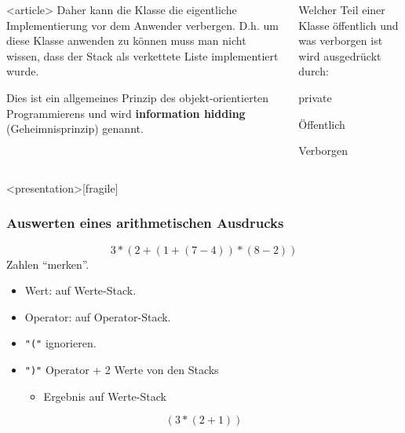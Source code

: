 \begin{multicols}{2}
\begin{frame}[fragile]
\begin{columns}[c]\begin{column}{0.45 \textwidth}
\begin{fact}
\begin{onlyenv}<article>
Daher kann die Klasse die eigentliche Implementierung vor dem Anwender verbergen.
D.h. um diese Klasse anwenden zu können muss man nicht wissen, dass der Stack als verkettete Liste implementiert wurde.
\end{onlyenv}
Dies ist ein allgemeines Prinzip des objekt-orientierten Programmierens und wird \textbf{information hidding} (Geheimnisprinzip) genannt.
\end{fact}
\end{column}\begin{column}{0.45 \textwidth}
\begin{definition}
Welcher Teil einer Klasse öffentlich und was verborgen ist wird ausgedrückt durch:
\begin{labeling}{private~}
\item [\textsf{public}] Öffentlich
\item [\textsf{private}] Verborgen
\end{labeling}
\end{definition}
\end{column}\end{columns}



\end{frame}


\end{multicols}

\begin{frame}<presentation>[fragile]
\frametitle{Auswerten eines arithmetischen Ausdrucks}
%
\[3 * (2 + ( 1 + ( 7- 4) ) * (8 - 2) )\]
%
Zahlen "`merken"'.
\vfill\pause

\begin{itemize}%
\item Wert: auf Werte-Stack.
\item Operator: auf Operator-Stack.
\item \lstinline{"("} ignorieren.
\item \lstinline{")"} Operator + 2 Werte von den Stacks 
	\begin{itemize}%
	\item Ergebnis auf Werte-Stack
	\end{itemize}
\end{itemize}

\vfill
{}
\[(3 * (2 + 1 ) )\]

\end{frame}

